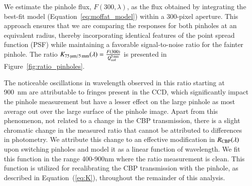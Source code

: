 

We estimate the pinhole flux, $F(300, \lambda)$, as the flux obtained by integrating the best-fit model (Equation~\ref{eq:moffat_model}) within a 300-pixel aperture. This approach ensures that we are comparing the \SD responses for both pinholes at an equivalent radius, thereby incorporating identical features of the point spread function (PSF) while maintaining a favorable signal-to-noise ratio for the fainter pinhole. The ratio $K_\mathrm{\SI{75}{\micro\meter}/\SI{5}{\milli\meter}}(\lambda)=\frac{F(300)}{Q_{\mathrm{ccd}}^{\SI{5}{\milli\meter}}}$ is presented in Figure~\ref{fig:ratio_pinholes}.

The noticeable oscillations in wavelength observed in this ratio starting at \SI{900}{nm} are attributable to fringes present in the CCD, which significantly impact the \spinhole pinhole measurement but have a lesser effect on the large pinhole as most average out over the large surface of the pinhole image. Apart from this phenomenon, not related to a change in the CBP transmission, there is a slight chromatic change in the measured ratio that cannot be attributed to differences in photometry. We attribute this change to an effective modification in $R_{\mathrm{CBP}}(\lambda)$ upon switching pinholes and model it as a linear function of wavelength. We fit this function in the range 400-900nm where the ratio measurement is clean. This function is utilized for recalibrating the CBP transmission with the \spinhole pinhole, as described in Equation~(\ref{eq:K}), throughout the remainder of this analysis.

